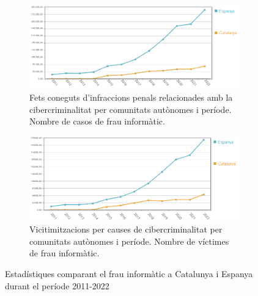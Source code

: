 \begin{figure}[H]
    \centering
    \begin{subfigure}[b]{0.8\textwidth}
      \includegraphics[width=\linewidth]{frau.png}
      \caption{Fets coneguts d'infraccions penals relacionades amb la cibercriminalitat per comunitats autònomes i període. Nombre de casos de frau informàtic.}
      \label{fig:frau}
    \end{subfigure}
  
    \vspace{1em} %
  
    \begin{subfigure}[b]{0.8\textwidth}
      \includegraphics[width=\linewidth]{victimes_frau.png}
      \caption{Vicitimitzacions per causes de cibercriminalitat per comunitats autònomes i període. Nombre de víctimes de frau informàtic.}
      \label{fig:victimes}
    \end{subfigure}
    
    \caption{Estadístiques comparant el frau informàtic a Catalunya i Espanya durant el període 2011-2022}
    \label{fig:frau_2}
\end{figure}


